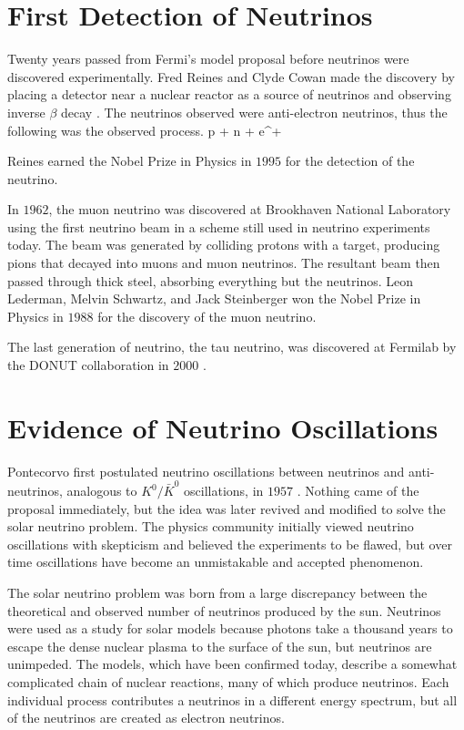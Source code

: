 \section{First Detection of Neutrinos}
\label{sec:1stDetection}

Twenty years passed from Fermi's model proposal before neutrinos were discovered experimentally. Fred Reines and Clyde Cowan made the discovery by placing a detector near a nuclear reactor as a source of neutrinos and observing inverse $\beta$ decay \cite{ref:1953, ref:1956}. The neutrinos observed were anti-electron neutrinos, thus the following was the observed process.
\beq
p + \anue \rightarrow n + e^{+}
\label{eq:BetaInv}
\eeq

\n Reines earned the Nobel Prize in Physics in $1995$ for the detection of the neutrino.

In $1962$, the muon neutrino was discovered at Brookhaven National Laboratory using the first neutrino beam \cite{ref:BNL} in a scheme still used in neutrino experiments today. The beam was generated by colliding protons with a target, producing pions that decayed into muons and muon neutrinos. The resultant beam then passed through thick steel, absorbing everything but the neutrinos. Leon Lederman, Melvin Schwartz, and Jack Steinberger won the Nobel Prize in Physics in $1988$ for the discovery of the muon neutrino.

The last generation of neutrino, the tau neutrino, was discovered at Fermilab by the DONUT collaboration in $2000$ \cite{ref:DONUT}.

\section{Evidence of Neutrino Oscillations}
\label{sec:OscHist}

Pontecorvo first postulated neutrino oscillations between neutrinos and anti-neutrinos, analogous to \linebreak$K^0/\bar{K}^0$ oscillations, in $1957$ \cite{ref:Pontecorvo1}. Nothing came of the proposal immediately, but the idea was later revived and modified to solve the solar neutrino problem. The physics community initially viewed neutrino oscillations with skepticism and believed the experiments to be flawed, but over time oscillations have become an unmistakable and accepted phenomenon.

The solar neutrino problem was born from a large discrepancy between the theoretical and observed number of neutrinos produced by the sun. Neutrinos were used as a study for solar models because photons take a thousand years to escape the dense nuclear plasma to the surface of the sun, but neutrinos are unimpeded. The models, which have been confirmed today, describe a somewhat complicated chain of nuclear reactions, many of which produce neutrinos. Each individual process contributes a neutrinos in a different energy spectrum, but all of the neutrinos are created as electron neutrinos.

